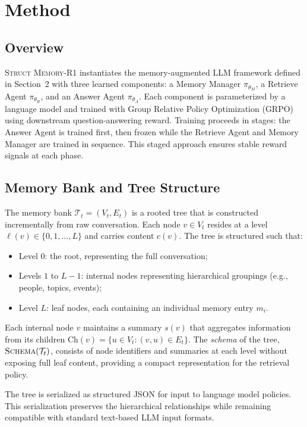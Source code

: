 \section{Method}

\subsection{Overview}
\textsc{Struct Memory-R1} instantiates the memory-augmented LLM framework defined in Section~2 with three learned components: a Memory Manager $\pi_{\theta_M}$, a Retrieve Agent $\pi_{\theta_R}$, and an Answer Agent $\pi_{\theta_A}$. Each component is parameterized by a language model and trained with Group Relative Policy Optimization (GRPO)~ using downstream question-answering reward. Training proceeds in stages: the Answer Agent is trained first, then frozen while the Retrieve Agent and Memory Manager are trained in sequence. This staged approach ensures stable reward signals at each phase.

\subsection{Memory Bank and Tree Structure}
The memory bank $\mathcal{T}_t = (V_t, E_t)$ is a rooted tree that is constructed incrementally from raw conversation. Each node $v \in V_t$ resides at a level $\ell(v) \in \{0, 1, \ldots, L\}$ and carries content $c(v)$. The tree is structured such that:
\begin{itemize}[nosep,leftmargin=1.5em]
\item Level 0: the root, representing the full conversation;
\item Levels $1$ to $L{-}1$: internal nodes representing hierarchical groupings (e.g., people, topics, events);
\item Level $L$: leaf nodes, each containing an individual memory entry $m_i$.
\end{itemize}
Each internal node $v$ maintains a summary $s(v)$ that aggregates information from its children $\text{Ch}(v) = \{u \in V_t : (v, u) \in E_t\}$. The \emph{schema} of the tree, $\textsc{Schema}(\mathcal{T}_t)$, consists of node identifiers and summaries at each level without exposing full leaf content, providing a compact representation for the retrieval policy.

The tree is serialized as structured JSON for input to language model policies. This serialization preserves the hierarchical relationships while remaining compatible with standard text-based LLM input formats.

